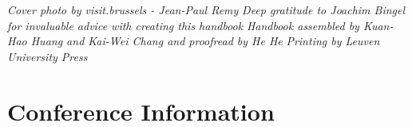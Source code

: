 \documentclass[twoside,makeidx]{book}
\begin{document}





\thispagestyle{empty}
\vspace*{6in}
\begin{linez}
\emph{Cover photo by \textcopyright visit.brussels - Jean-Paul Remy}
\emph{Deep gratitude to Joachim Bingel for invaluable advice with creating this handbook}
    \emph{Handbook assembled by Kuan-Hao Huang and Kai-Wei Chang and proofread by He He}
\emph{Printing by Leuven University Press}
\end{linez}

%

\frontmatter

\setcounter{tocdepth}{2}
\tableofcontents
\mainmatter

\chapter{Conference Information}

\clearpage


\clearpage%
\setheaders{}{}


\clearpage%
\setheaders{}{}

%



\cleardoublepage


\end{document}
